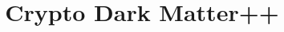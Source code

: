 \documentclass[11pt]{article}
\begin{document}
\title{Crypto Dark Matter++}
\author{}
\date{}

\maketitle




\printbibliography  
\end{document}
